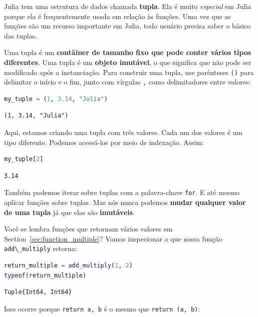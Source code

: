\documentclass[
  notoc %
]{tufte-book}
\newcommand{\passthrough}[1]{#1}
\begin{document}
Julia tem uma estrutura de dados chamada \textbf{tupla}. Ela é muito
\emph{especial} em Julia porque ela é frequentemente usada em relação às
funções. Uma vez que as funções são um recurso importante em Julia, todo
usuário precisa saber o básico das tuplas.

Uma tupla é um \textbf{contâiner de tamanho fixo que pode conter vários
tipos diferentes}. Uma tupla é um \textbf{objeto imutável}, o que
significa que não pode ser modificado após a instanciação. Para
construir uma tupla, use parênteses \passthrough{\lstinline!()!} para
delimitar o início e o fim, junto com vírgulas
\passthrough{\lstinline!,!} como delimitadores entre valores:

\begin{lstlisting}[language=Julia]
my_tuple = (1, 3.14, "Julia")
\end{lstlisting}

\begin{lstlisting}[language=Output]
(1, 3.14, "Julia")
\end{lstlisting}

Aqui, estamos criando uma tupla com três valores. Cada um dos valores é
um tipo diferente. Podemos acessá-los por meio de indexação. Assim:

\begin{lstlisting}[language=Julia]
my_tuple[2]
\end{lstlisting}

\begin{lstlisting}[language=Output]
3.14
\end{lstlisting}

Também podemos iterar sobre tuplas com a palavra-chave
\passthrough{\lstinline!for!}. E até mesmo aplicar funções sobre tuplas.
Mas nós nunca podemos \textbf{mudar qualquer valor de uma tupla} já que
elas são \textbf{imutáveis}.

Você se lembra funções que retornam vários valores em
Section~\ref{sec:function_multiple}? Vamos inspecionar o que nossa
função \passthrough{\lstinline!add\_multiply!} retorna:

\begin{lstlisting}[language=Julia]
return_multiple = add_multiply(1, 2)
typeof(return_multiple)
\end{lstlisting}

\begin{lstlisting}[language=Output]
Tuple{Int64, Int64}
\end{lstlisting}

Isso ocorre porque \passthrough{\lstinline!return a, b!} é o mesmo que
\passthrough{\lstinline!return (a, b)!}:
\end{document}

